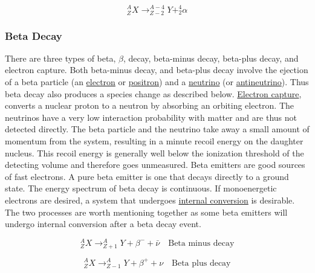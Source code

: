 \documentclass[12pt]{article}
\begin{document}
\begin{doublespacing}
\begin{equation} \label{alphaDecayEqn}
^A_Z X \rightarrow ^{A-4}_{Z-2}Y + ^4_2 \alpha
\end{equation}


\subsubsection{Beta Decay}
There are three types of beta, $\beta$, decay, beta-minus decay, beta-plus decay, and electron capture. Both beta-minus decay, and beta-plus decay involve the ejection of a beta particle (an \href{http://en.wikipedia.org/wiki/Electron}{electron} or \href{http://en.wikipedia.org/wiki/Positron}{positron}) and a \href{http://en.wikipedia.org/wiki/Neutrino}{neutrino} (or \href{http://en.wikipedia.org/wiki/Antineutrino#Antineutrinos}{antineutrino}). Thus beta decay also produces a species change as described below. \href{https://en.wikipedia.org/wiki/Electron_capture}{Electron capture}, converts a nuclear proton to a neutron by absorbing an orbiting electron.
The neutrinos have a very low interaction probability with matter and are thus not detected directly. The beta particle and the neutrino take away a small amount of momentum from the system, resulting in a minute recoil energy on the daughter nucleus. This recoil energy is generally well below the ionization threshold of the detecting volume and therefore goes unmeasured.
Beta emitters are good sources of fast electrons. A pure beta emitter is one that decays directly to a ground state. The energy spectrum of beta decay is continuous. If monoenergetic electrons are desired, a system that undergoes \href{https://en.wikipedia.org/wiki/Internal_conversion}{internal conversion} is desirable. The two processes are worth mentioning together as some beta emitters will undergo internal conversion after a beta decay event.

\begin{equation} \label{betaMinusDecayEqn}
^A_Z X \rightarrow ^{A}_{Z+1}Y + \beta^{-} + \bar{\nu} \quad \mbox{Beta minus decay}
\end{equation}

\begin{equation} \label{betaPlusDecayEqn}
^A_Z X \rightarrow ^{A}_{Z-1}Y + \beta^{+} + \nu \quad \mbox{Beta plus decay}
\end{equation}


\end{doublespacing}
\end{document}
